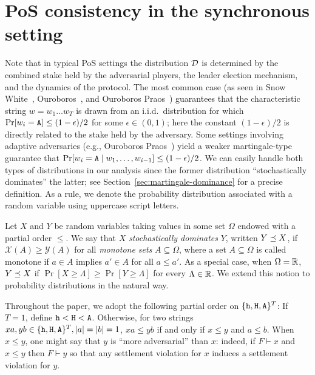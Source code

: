   \section{PoS consistency in the synchronous setting}\label{sec:main-thm-multihonest}
  Note that in typical PoS settings the distribution $\mathcal{D}$
  is determined by the combined stake held by the adversarial players,
  the leader election mechanism, and the dynamics of the protocol. The
  most common case (as seen in Snow White~\cite{SnowWhite},
  Ouroboros~\cite{Ouroboros}, and Ouroboros Praos~\cite{Praos})
  guarantees that the characteristic string $w = w_1 \ldots w_T$ is
  drawn from an i.i.d.\ distribution for which
  $\Pr[w_i = \mathtt{A}] \leq (1 - \epsilon)/2$ for some $\epsilon \in (0, 1)$;
  here the constant $(1-\epsilon)/2$ is directly related to the stake
  held by the adversary. Some settings involving adaptive adversaries
  (e.g., Ouroboros Praos~\cite{Praos}) yield a weaker martingale-type
  guarantee that
  $\Pr[w_i = \mathtt{A} \mid w_1, \ldots, w_{i-1}] \leq (1 - \epsilon)/2$.  We
  can easily handle both types of distributions in our analysis since
  the former distribution ``stochastically dominates'' the latter; 
  see Section~\ref{sec:martingale-dominance} for a precise definition.
  As a rule, we denote the
  probability distribution associated with a random variable using
  uppercase script letters. 
  \begin{definition}\label{def:dominance-mh} 
    Let $X$ and $Y$ be random variables taking values in some set $\Omega$ 
    endowed with a partial order $\leq$. 
    We say that $X$ \emph{stochastically dominates} $Y$, 
    written $Y \preceq X$, if 
    $
      \mathcal{X}(A) \geq \mathcal{Y}(A)
    $ 
    for all \emph{monotone sets} $A \subseteq \Omega$, 
    where a set $A \subseteq \Omega$ is called 
    monotone if $a \in A$ implies $a' \in A$ for all $a \leq a'$.
    As a special case, when $\Omega = \mathbb{R}$,  $Y \preceq X$ if
    $\Pr[X \geq \Lambda] \geq \Pr[Y \geq \Lambda]$
    for every $\Lambda \in \mathbb{R}$.  
    We extend this notion to probability
    distributions in the natural way.
  \end{definition}

  Throughout the paper, we adopt the following partial order on
  $\{\mathtt{h}, \mathtt{H}, \mathtt{A}\}^T$: If $T = 1$, define $\mathtt{h} < \mathtt{H} < \mathtt{A}$.  Otherwise,
  for two strings $xa, yb \in \{\mathtt{h}, \mathtt{H}, \mathtt{A}\}^T, |a| = |b| = 1$,
  $xa \leq yb$ if and only if $x \leq y$ and $a \leq b$. When
  $x \leq y$, one might say that $y$ is ``more adversarial'' than $x$:
  indeed, if $F \vdash x$ and $x \leq y$ then $F \vdash y$ so that any
  settlement violation for $x$ induces a settlement violation for $y$.

